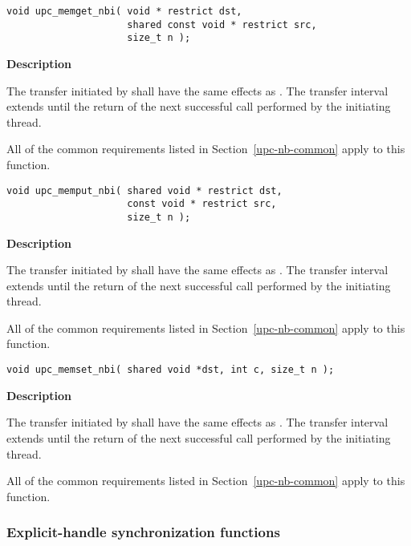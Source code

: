 \def\bfunc{upc\_memget\_nbi}
\def\sfunc{\memget}
\funcheader

\begin{verbatim}
void upc_memget_nbi( void * restrict dst, 
                     shared const void * restrict src, 
                     size_t n );
\end{verbatim}

{\bf Description}

\np The transfer initiated by \func\args shall have the same effects as \sfunc\args.
The transfer interval extends until the return of the next successful 
\synci call performed by the initiating thread.

\np All of the common requirements listed in Section~\ref{upc-nb-common} apply to this function.

\def\bfunc{upc\_memput\_nbi}
\def\sfunc{\memput}
\funcheader

\begin{verbatim}
void upc_memput_nbi( shared void * restrict dst, 
                     const void * restrict src, 
                     size_t n );
\end{verbatim}

{\bf Description}

\np The transfer initiated by \func shall have the same effects as \sfunc.
The transfer interval extends until the return of the next successful 
\synci call performed by the initiating thread.

\np All of the common requirements listed in Section~\ref{upc-nb-common} apply to this function.

\newpage
\def\bfunc{upc\_memset\_nbi}
\def\sfunc{\memset}
\funcheader

\begin{verbatim}
void upc_memset_nbi( shared void *dst, int c, size_t n );
\end{verbatim}

{\bf Description}

\np The transfer initiated by \func\sargs shall have the same effects as \sfunc\sargs.
The transfer interval extends until the return of the next successful 
\synci call performed by the initiating thread.

\np All of the common requirements listed in Section~\ref{upc-nb-common} apply to this function.

\newpage
\subsubsection{Explicit-handle synchronization functions}
\def\bfunc{upc\_sync\_attempt}
\funcheader

